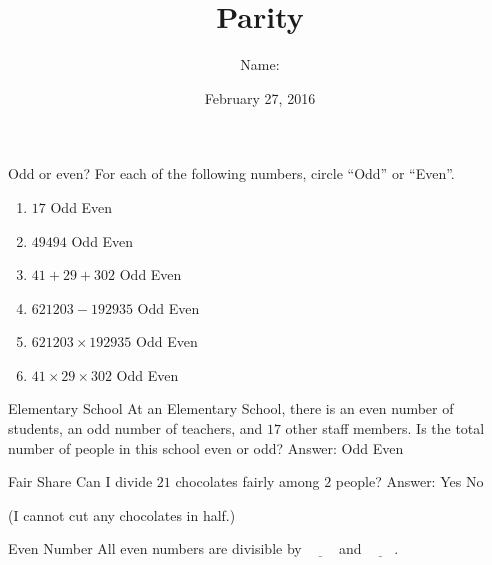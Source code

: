 \documentclass[12pt,letterpaper]{article}
\title{Parity}
\author{Name: \underline{\hspace{5cm}}}
\date{February 27, 2016}
\begin{document}
\maketitle

\thispagestyle{empty}

\begin{problem}{Odd or even?}
For each of the following numbers, circle ``Odd'' or ``Even''.
\begin{enumerate}
 \item $17$ \hfill Odd \hspace{1em} Even
 \item $49494$ \hfill Odd \hspace{1em} Even
 \item $41 + 29 + 302$ \hfill Odd \hspace{1em} Even
 \item $621203 - 192935$ \hfill Odd \hspace{1em} Even
 \item $621203 \times 192935$ \hfill Odd \hspace{1em} Even
 \item $41 \times 29 \times 302$ \hfill Odd \hspace{1em} Even
\end{enumerate}
\end{problem}

\begin{problem}{Elementary School}
 At an Elementary School, there is an even number of students, an odd number of
 teachers, and $17$ other staff members. Is the total number of people in this
 school even or odd?
 \hfill Answer: Odd \hspace{1em} Even
\end{problem}

\begin{problem}{Fair Share}
 Can I divide $21$ chocolates fairly among $2$ people?
 \hfill Answer: Yes \hspace{1em} No

 (I cannot cut any chocolates in half.)
\end{problem}

\begin{problem}{Even Number}
 All even numbers are divisible by $\underline{\hspace{2em}}$ and
 $\underline{\hspace{2em}}$.
\end{problem}
\end{document}
